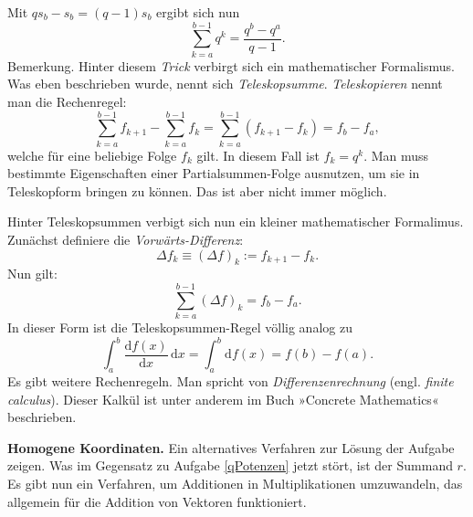 \documentclass[a4paper,12pt,fleqn,twoside]{article}
\numberwithin{equation}{section}
\newcommand{\strong}[1]{{\sf\bfseries #1}}
\theoremstyle{definition}
\begin{document}
Mit $qs_b-s_b=(q-1)s_b$ ergibt sich nun
\[\sum_{k=a}^{b-1} q^k = \frac{q^b-q^a}{q-1}.\]
Bemerkung. Hinter diesem \emph{Trick} verbirgt sich ein mathematischer
Formalismus. Was eben beschrieben wurde, nennt sich
\emph{Teleskopsumme}. \emph{Teleskopieren} nennt man die Rechenregel:
\[\sum_{k=a}^{b-1} f_{k+1} - \sum_{k=a}^{b-1} f_k
= \sum_{k=a}^{b-1} (f_{k+1}-f_k) = f_b-f_a,\]
welche für eine beliebige Folge $f_k$ gilt. In diesem Fall ist
$f_k=q^k$. Man muss bestimmte Eigenschaften einer Partialsummen-Folge
ausnutzen, um sie in Teleskopform bringen zu können. Das ist aber nicht
immer möglich.

Hinter Teleskopsummen verbigt sich nun ein kleiner mathematischer
Formalimus. Zunächst definiere die \emph{Vorwärts-Differenz}:
\[\Delta f_k\equiv (\Delta f)_k := f_{k+1}-f_k.\]
Nun gilt:
\[\sum_{k=a}^{b-1} (\Delta f)_k = f_b-f_a.\]
In dieser Form ist die Teleskopsummen-Regel völlig analog zu
\[\int_a^b \frac{\mathrm df(x)}{\mathrm dx}\,\mathrm dx
= \int_a^b \mathrm df(x) = f(b)-f(a).\]
Es gibt weitere Rechenregeln. Man spricht von \emph{Differenzenrechnung}
(engl. \emph{finite calculus}). Dieser Kalkül ist unter anderem
im Buch »Concrete Mathematics« beschrieben.

\strong{Homogene Koordinaten.}
Ein alternatives Verfahren zur Lösung der Aufgabe zeigen.
Was im Gegensatz zu Aufgabe \ref{qPotenzen}
jetzt stört, ist der Summand $r$. Es gibt nun ein Verfahren, um
Additionen in Multiplikationen umzuwandeln, das allgemein für die
Addition von Vektoren funktioniert.
\end{document}
